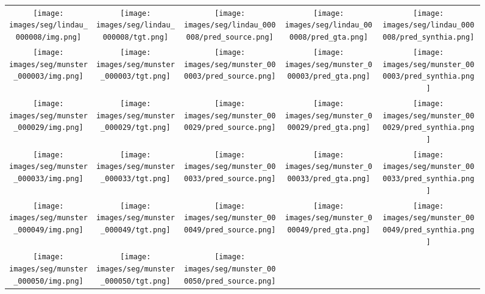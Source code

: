 \documentclass{bmvc2k}
\begin{document}
\begin{figure}[!htb]
	\centering
	\begin{tabular}{@{\hskip2pt}c@{\hskip2pt}c@{\hskip2pt}c@{\hskip2pt}c@{\hskip2pt}c}
		\texttt{[image: images/seg/lindau\_000008/img.png]}&
		\texttt{[image: images/seg/lindau\_000008/tgt.png]}&
		\texttt{[image: images/seg/lindau\_000008/pred\_source.png]}&
		\texttt{[image: images/seg/lindau\_000008/pred\_gta.png]}&
		\texttt{[image: images/seg/lindau\_000008/pred\_synthia.png]}\\
		\texttt{[image: images/seg/munster\_000003/img.png]}&
		\texttt{[image: images/seg/munster\_000003/tgt.png]}&
		\texttt{[image: images/seg/munster\_000003/pred\_source.png]}&
		\texttt{[image: images/seg/munster\_000003/pred\_gta.png]}&
		\texttt{[image: images/seg/munster\_000003/pred\_synthia.png]}\\
		\texttt{[image: images/seg/munster\_000029/img.png]}&
		\texttt{[image: images/seg/munster\_000029/tgt.png]}&
		\texttt{[image: images/seg/munster\_000029/pred\_source.png]}&
		\texttt{[image: images/seg/munster\_000029/pred\_gta.png]}&
		\texttt{[image: images/seg/munster\_000029/pred\_synthia.png]}\\
		\texttt{[image: images/seg/munster\_000033/img.png]}&
		\texttt{[image: images/seg/munster\_000033/tgt.png]}&
		\texttt{[image: images/seg/munster\_000033/pred\_source.png]}&
		\texttt{[image: images/seg/munster\_000033/pred\_gta.png]}&
		\texttt{[image: images/seg/munster\_000033/pred\_synthia.png]}\\
		\texttt{[image: images/seg/munster\_000049/img.png]}&
		\texttt{[image: images/seg/munster\_000049/tgt.png]}&
		\texttt{[image: images/seg/munster\_000049/pred\_source.png]}&
		\texttt{[image: images/seg/munster\_000049/pred\_gta.png]}&
		\texttt{[image: images/seg/munster\_000049/pred\_synthia.png]}\\
		\texttt{[image: images/seg/munster\_000050/img.png]}&
		\texttt{[image: images/seg/munster\_000050/tgt.png]}&
		\texttt{[image: images/seg/munster\_000050/pred\_source.png]}&

\end{tabular}
\end{figure}
\end{document}
